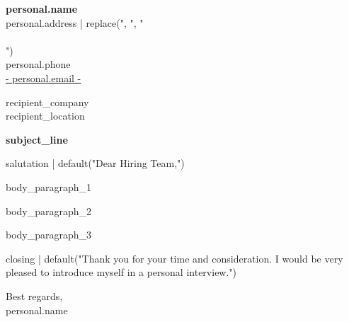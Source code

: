 \documentclass[a4paper,10.5pt]{article}
\begin{document}
\vspace*{-0.45cm}

{\Large\bfseries {{ personal.name }}}\\[4pt]
{{ personal.address | replace(", ", "\\\\\n") }}\\
{{ personal.phone }}\\
\href{mailto:{{ personal.email }}}{ {{- personal.email -}} }

\vspace{0.8cm}

{{ recipient_company }}\\
{{ recipient_location }}

\vspace{0.7cm}

{\color{accent}\large\bfseries {{ subject_line }}}

\vspace{0.7cm}

{{ salutation | default("Dear Hiring Team,") }}

{{ body_paragraph_1 }}

{{ body_paragraph_2 }}

{{ body_paragraph_3 }}

{{ closing | default("Thank you for your time and consideration. I would be very pleased to introduce myself in a personal interview.") }}

\vspace{0.8cm}

Best regards,\\[4pt]
{{ personal.name }}
\end{document}
